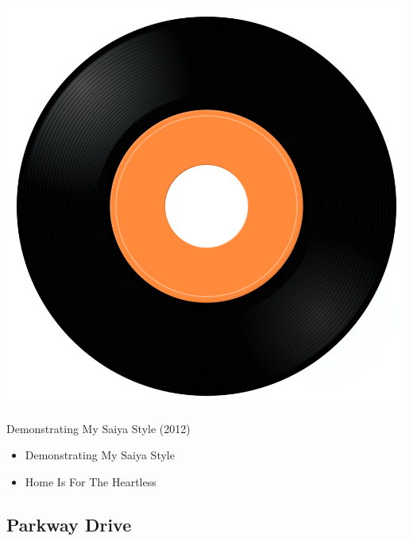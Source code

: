 \begin{minipage}[t]{0.25\textwidth}\vspace{0pt}
\captionsetup{type=figure}
\includegraphics[width=\textwidth]{Images/cover.png}
\caption*{Demonstrating My Saiya Style (2012)}
\end{minipage}
\begin{minipage}[t]{0.25\textwidth}\vspace{0pt}
\begin{itemize}[nosep,leftmargin=1em,labelwidth=*,align=left]
	\setlength{\itemsep}{0pt}
	\item Demonstrating My Saiya Style
	\item Home Is For The Heartless
\end{itemize}
\end{minipage}

\subsection{Parkway Drive}

